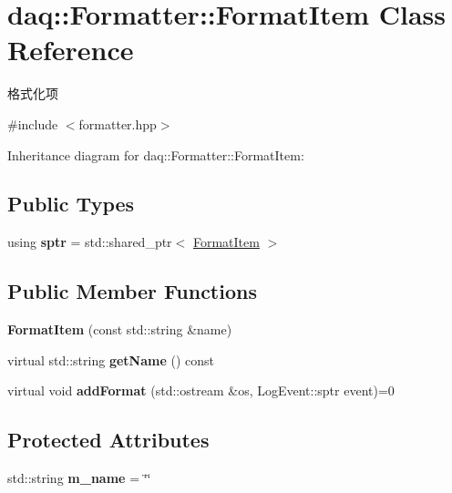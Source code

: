 \hypertarget{classdaq_1_1Formatter_1_1FormatItem}{}\section{daq\+:\+:Formatter\+:\+:Format\+Item Class Reference}
\label{classdaq_1_1Formatter_1_1FormatItem}


格式化项  




{\ttfamily \#include $<$formatter.\+hpp$>$}



Inheritance diagram for daq\+:\+:Formatter\+:\+:Format\+Item\+:
\subsection*{Public Types}
\begin{DoxyCompactItemize}
\item 
\mbox{\label{classdaq_1_1Formatter_1_1FormatItem_a12e165e54d52b7e20dd01287265e25cb}} 
using {\bfseries sptr} = std\+::shared\+\_\+ptr$<$ \hyperlink{classdaq_1_1Formatter_1_1FormatItem}{Format\+Item} $>$
\end{DoxyCompactItemize}
\subsection*{Public Member Functions}
\begin{DoxyCompactItemize}
\item 
\mbox{\label{classdaq_1_1Formatter_1_1FormatItem_a18fde9050646c2822375fc4b9bf7f5a9}} 
{\bfseries Format\+Item} (const std\+::string \&name)
\item 
\mbox{\label{classdaq_1_1Formatter_1_1FormatItem_a0261c48393c716f3b3123ae29d2453ec}} 
virtual std\+::string {\bfseries get\+Name} () const
\item 
\mbox{\label{classdaq_1_1Formatter_1_1FormatItem_a51a0174332368df8b6dc047de8558b2e}} 
virtual void {\bfseries add\+Format} (std\+::ostream \&os, Log\+Event\+::sptr event)=0
\end{DoxyCompactItemize}
\subsection*{Protected Attributes}
\begin{DoxyCompactItemize}
\item 
\mbox{\label{classdaq_1_1Formatter_1_1FormatItem_a90c74679c495924cb79233ceffd6dc07}} 
std\+::string {\bfseries m\+\_\+name} = \char`\"{}\char`\"{}
\end{DoxyCompactItemize}


